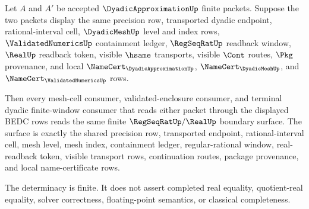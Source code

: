 \begin{theorem}
\label{thm:dyadicapproximation-shared-real-boundary-determinacy}
Let $A$ and $A'$ be accepted $\DyadicApproximationUp$ finite packets. Suppose
the two packets display the same precision row, transported dyadic endpoint,
rational-interval cell, $\DyadicMeshUp$ level and index rows,
$\ValidatedNumericsUp$ containment ledger, $\RegSeqRatUp$ readback window,
$\RealUp$ readback token, visible $\hsame$ transports, visible $\Cont$
routes, $\Pkg$ provenance, and local $\NameCert_{\DyadicApproximationUp}$,
$\NameCert_{\DyadicMeshUp}$, and $\NameCert_{\ValidatedNumericsUp}$ rows.

Then every mesh-cell consumer, validated-enclosure consumer, and terminal
dyadic finite-window consumer that reads either packet through the displayed
BEDC rows reads the same finite $\RegSeqRatUp/\RealUp$ boundary surface. The
surface is exactly the shared precision row, transported endpoint,
rational-interval cell, mesh level, mesh index, containment ledger,
regular-rational window, real-readback token, visible transport rows,
continuation routes, package provenance, and local name-certificate rows.

The determinacy is finite. It does not assert completed real equality,
quotient-real equality, solver correctness, floating-point semantics, or
classical completeness.
\end{theorem}
